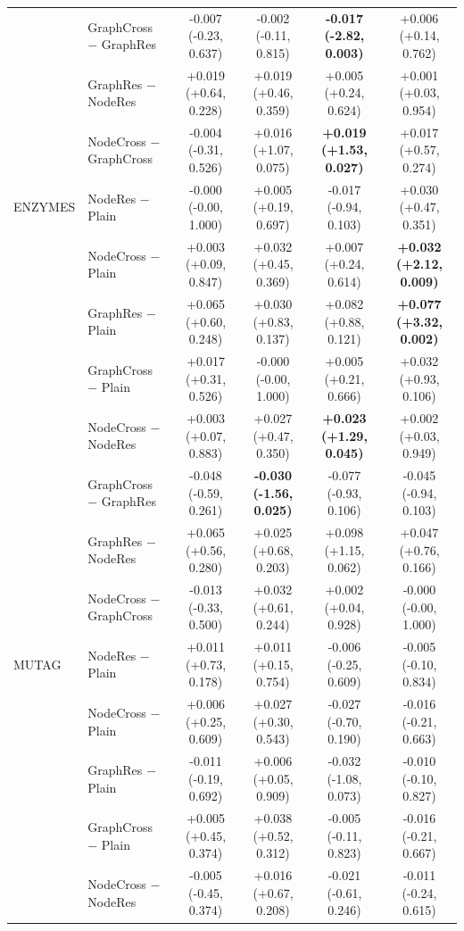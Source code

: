 \begin{table}[t]
\begin{tabular}{llcccc}
 & GraphCross $-$ GraphRes & -0.007 (-0.23, 0.637) & -0.002 (-0.11, 0.815) & \textbf{-0.017 (-2.82, 0.003)} & +0.006 (+0.14, 0.762) \\
 & GraphRes $-$ NodeRes & +0.019 (+0.64, 0.228) & +0.019 (+0.46, 0.359) & +0.005 (+0.24, 0.624) & +0.001 (+0.03, 0.954) \\
 & NodeCross $-$ GraphCross & -0.004 (-0.31, 0.526) & +0.016 (+1.07, 0.075) & \textbf{+0.019 (+1.53, 0.027)} & +0.017 (+0.57, 0.274) \\
\midrule
ENZYMES & NodeRes $-$ Plain & -0.000 (-0.00, 1.000) & +0.005 (+0.19, 0.697) & -0.017 (-0.94, 0.103) & +0.030 (+0.47, 0.351) \\
 & NodeCross $-$ Plain & +0.003 (+0.09, 0.847) & +0.032 (+0.45, 0.369) & +0.007 (+0.24, 0.614) & \textbf{+0.032 (+2.12, 0.009)} \\
 & GraphRes $-$ Plain & +0.065 (+0.60, 0.248) & +0.030 (+0.83, 0.137) & +0.082 (+0.88, 0.121) & \textbf{+0.077 (+3.32, 0.002)} \\
 & GraphCross $-$ Plain & +0.017 (+0.31, 0.526) & -0.000 (-0.00, 1.000) & +0.005 (+0.21, 0.666) & +0.032 (+0.93, 0.106) \\
 & NodeCross $-$ NodeRes & +0.003 (+0.07, 0.883) & +0.027 (+0.47, 0.350) & \textbf{+0.023 (+1.29, 0.045)} & +0.002 (+0.03, 0.949) \\
 & GraphCross $-$ GraphRes & -0.048 (-0.59, 0.261) & \textbf{-0.030 (-1.56, 0.025)} & -0.077 (-0.93, 0.106) & -0.045 (-0.94, 0.103) \\
 & GraphRes $-$ NodeRes & +0.065 (+0.56, 0.280) & +0.025 (+0.68, 0.203) & +0.098 (+1.15, 0.062) & +0.047 (+0.76, 0.166) \\
 & NodeCross $-$ GraphCross & -0.013 (-0.33, 0.500) & +0.032 (+0.61, 0.244) & +0.002 (+0.04, 0.928) & -0.000 (-0.00, 1.000) \\
\midrule
MUTAG & NodeRes $-$ Plain & +0.011 (+0.73, 0.178) & +0.011 (+0.15, 0.754) & -0.006 (-0.25, 0.609) & -0.005 (-0.10, 0.834) \\
 & NodeCross $-$ Plain & +0.006 (+0.25, 0.609) & +0.027 (+0.30, 0.543) & -0.027 (-0.70, 0.190) & -0.016 (-0.21, 0.663) \\
 & GraphRes $-$ Plain & -0.011 (-0.19, 0.692) & +0.006 (+0.05, 0.909) & -0.032 (-1.08, 0.073) & -0.010 (-0.10, 0.827) \\
 & GraphCross $-$ Plain & +0.005 (+0.45, 0.374) & +0.038 (+0.52, 0.312) & -0.005 (-0.11, 0.823) & -0.016 (-0.21, 0.667) \\
 & NodeCross $-$ NodeRes & -0.005 (-0.45, 0.374) & +0.016 (+0.67, 0.208) & -0.021 (-0.61, 0.246) & -0.011 (-0.24, 0.615) \\

\end{tabular}
\end{table}
